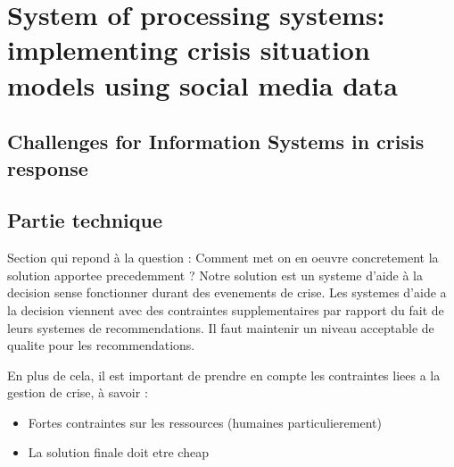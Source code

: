 \chapter*{System of processing systems: implementing crisis situation models using social media data}


\section{Challenges for Information Systems in crisis response}

\section{Partie technique}

Section qui repond à la question : Comment met on en oeuvre concretement la solution apportee precedemment ?
Notre solution est un systeme d'aide à la decision sense fonctionner durant des evenements de crise.
Les systemes d'aide a la decision viennent avec des contraintes supplementaires par rapport du fait de leurs systemes de recommendations.
Il faut maintenir un niveau acceptable de qualite pour les recommendations.

En plus de cela, il est important de prendre en compte les contraintes liees a la gestion de crise, à savoir :
\begin{itemize}
    \item Fortes contraintes sur les ressources (humaines particulierement)
    \item La solution finale doit etre cheap
\end{itemize}


